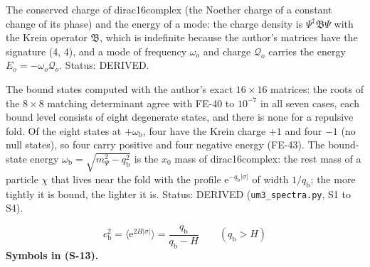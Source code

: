 \documentclass[
  10pt,
]{article}
\begin{document}
The conserved charge of dirac16complex (the Noether charge of a constant
change of its phase) and the energy of a mode: the charge density is
\(\Psi^\dagger\mathfrak{B}\Psi\) with the Krein operator
\(\mathfrak{B}\), which is indefinite because the author's matrices have
the signature (4, 4), and a mode of frequency \(\omega_o\) and charge
\(\mathcal{Q}_o\) carries the energy \(E_o = -\omega_o\mathcal{Q}_o\).
Status: DERIVED.

The bound states computed with the author's exact \(16 \times 16\)
matrices: the roots of the \(8 \times 8\) matching determinant agree
with FE-40 to \(10^{-7}\) in all seven cases, each bound level consists
of eight degenerate states, and there is none for a repulsive fold. Of
the eight states at \(+\omega_{\mathrm{b}}\), four have the Krein charge
\(+1\) and four \(-1\) (no null states), so four carry positive and four
negative energy (FE-43). The bound-state energy
\(\omega_{\mathrm{b}} = \sqrt{m_\Psi^2 - q_{\mathrm{b}}^2}\) is the
\(x_0\) mass of dirac16complex: the rest mass of a particle \(\chi\)
that lives near the fold with the profile
\(\mathrm{e}^{-q_{\mathrm{b}}\lvert\sigma\rvert}\) of width
\(1/q_{\mathrm{b}}\); the more tightly it is bound, the lighter it is.
Status: DERIVED (\texttt{um3\_spectra.py}, S1 to S4).

\[
c_{\mathrm{b}}^2 = \big\langle\mathrm{e}^{2H\lvert\sigma\rvert}\big\rangle = \frac{q_{\mathrm{b}}}{q_{\mathrm{b}} - H}\qquad(q_{\mathrm{b}} > H) \tag{S-13}
\] \textbf{Symbols in (S-13).}
\end{document}
